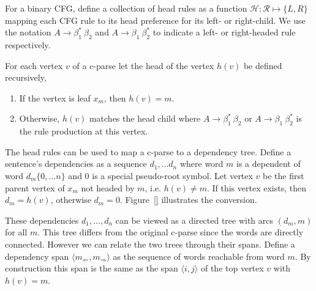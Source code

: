 \documentclass[11pt,letterpaper]{article}
\newcommand{\rules}{\mathcal{R}}
\newcommand{\Left}[1]{#1_{\Leftarrow}}
\newcommand{\Right}[1]{#1_{\Rightarrow}}
\newcommand{\Span}[1]{\langle #1 \rangle}
\newcommand{\RuleA}[3]{#1 \rightarrow #2^*\ #3}
\newcommand{\RuleB}[3]{#1 \rightarrow #2\ #3^*}
\begin{document}
For a binary CFG, define a collection of head rules as a function $\mathcal{H} : \rules \mapsto \{L, R\}$ 
mapping each CFG rule to its head preference for its left- or right-child. We use the notation 
$\RuleA{A}{\beta_1}{\beta_2}$ and $\RuleB{A}{\beta_1}{\beta_2}$ to indicate a left-
or right-headed rule respectively. 

For each vertex $v$ of a c-parse let the head of the vertex $h(v)$ be defined recursively,
 
 \begin{enumerate}
  \item  If the vertex is leaf $x_m$, then $h(v)=m$.
  \item Otherwise,  $h(v)$ matches the head child where $\RuleA{A}{\beta_1}{\beta_2}$ or $\RuleB{A}{\beta_1}{\beta_2}$  is the rule production at this vertex.
  \end{enumerate}

The head rules can be used to map a c-parse to a dependency tree.
Define a sentence's dependencies as a sequence $d_1, \ldots d_n$ 
where word $m$ is a dependent of word $d_m \{0, \ldots n\}$ and $0$ is 
a special pseudo-root symbol. Let vertex $v$ be the first 
parent vertex of $x_m$ not headed by $m$, i.e. $h(v) \neq m$. 
If this vertex exists, then $d_m = h(v)$, otherwise $d_m = 0$.  
Figure~\ref{} illustrates the conversion.





These dependencies $d_1, \ldots, d_n$ can be viewed as a directed tree with arcs
$(d_m, m)$ for all $m$. This tree differs from the original c-parse
since the words are directly connected. However we can relate the two
trees through their spans. Define a dependency span $\Span{\Left{m},
  \Right{m}}$ as the sequence of words reachable from word $m$. By
construction this span is the same as the span $\Span{i, j}$
of the top vertex $v$ with $h(v) = m$.

\end{document}
